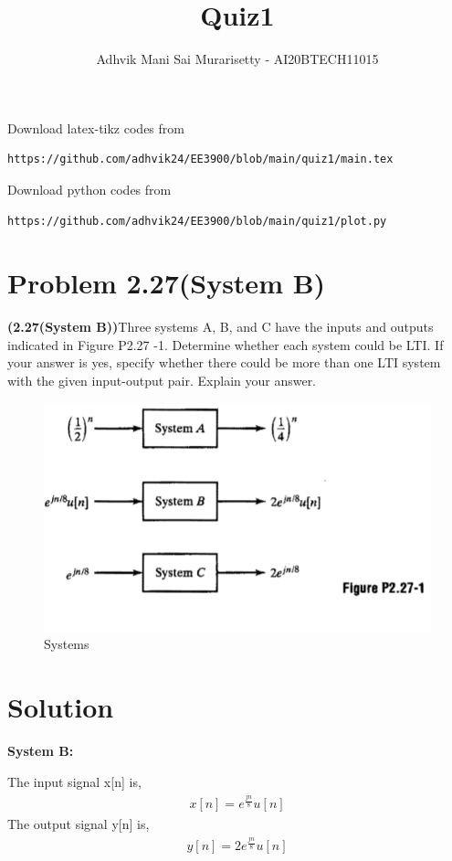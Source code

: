 \documentclass[journal,12pt,twocolumn]{IEEEtran}
\begin{document}
\vspace{3cm}
\title{Quiz1}
\author{Adhvik Mani Sai Murarisetty - AI20BTECH11015}
\maketitle
\newpage
\bigskip
\renewcommand{\thetable}{\theenumi}

Download latex-tikz codes from 
%
\begin{lstlisting}
https://github.com/adhvik24/EE3900/blob/main/quiz1/main.tex
\end{lstlisting}
%
Download python codes from 
%
\begin{lstlisting}
https://github.com/adhvik24/EE3900/blob/main/quiz1/plot.py
\end{lstlisting}
\section*{Problem 2.27(System B)}
\textbf{(2.27(System B))}Three systems A, B, and C have the inputs and outputs indicated in Figure P2.27 -1. Determine whether each system could be LTI. If your answer is yes, specify whether there could
be more than one LTI system with the given input-output pair. Explain your answer. 

\begin{figure}[!htp]
    \centering
    \includegraphics[width = \columnwidth]{q1.PNG}
    \caption{Systems}
    \label{f0}
\end{figure}

\section*{Solution}
\textbf{System B:}

The input signal x[n] is,
\begin{align}
    x[n]=e^{\frac{jn}{8}}u[n]\label{0}
\end{align}
The output signal y[n] is,
\begin{align}
    y[n]=2e^{\frac{jn}{8}}u[n]\label{1}
\end{align}
\end{document}
